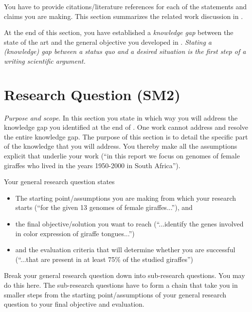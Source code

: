 You have to provide citations/literature references for each of the statements and claims you are making.
This section summarizes the related work discussion in .

At the end of this section, you have established a \emph{knowledge gap} between the state of the art and the general objective you developed in .
\emph{Stating a (knowledge) gap between a status quo and a desired situation is the \emph{first step} of a writing scientific argument.}

\section{Research Question (SM2)}\label{sec:introduction:research-question}

\emph{Purpose and scope}.
In this section you state in which way you will address the knowledge gap you identified at the end of .
One work cannot address and resolve the entire knowledge gap.
The purpose of this section is to detail the specific part of the knowledge that you will address.
You thereby make all the assumptions explicit that underlie your work (``in this report we focus on genomes of female giraffes who lived in the years 1950-2000 in South Africa'').

Your general research question states
\begin{itemize}
  \item The starting point/assumptions you are making from which your research starts (``for the given 13 genomes of female giraffes...''), and
  \item the final objective/solution you want to reach (``...identify the genes involved in color expression of giraffe tongues...'')
  \item and the evaluation criteria that will determine whether you are successful (``...that are present in at least 75\% of the studied giraffes'')
\end{itemize}

Break your general research question down into sub-research questions.
You may do this here.
The sub-research questions have to form a chain that take you in smaller steps from the starting point/assumptions of your general research question to your final objective and evaluation.

